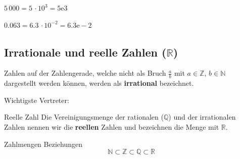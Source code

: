 $5\,000 = 5\, \cdot 10^{3} = 5\mathrm{e}3$

$0.063 = 6.3\, \cdot 10^{-2} = 6.3\mathrm{e-}2$

\newpage

\subsection{Irrationale und reelle Zahlen ($\mathbb{R}$)}

  Zahlen auf der Zahlengerade, welche nicht als Bruch $\frac{a}{b}$ mit $a\in\mathbb{Z}$, $b \in \mathbb{N}$ dargestellt werden können, werden als \textbf{irrational} bezeichnet.

Wichtigste Vertreter:

\begin{center}
\end{center}

\begin{definition}{Reelle Zahl}{}
Die Vereinigungsmenge der rationalen ($\mathbb{Q}$) und der irrationalen Zahlen
nennen wir die \textbf{reellen} Zahlen und bezeichnen die Menge mit $\mathbb{R}$.
\end{definition}

\begin{gesetz}{Zahlmengen Beziehungen}{}
$$\mathbb{N} \subset \mathbb{Z} \subset \mathbb{Q} \subset \mathbb{R} $$
\end{gesetz}


